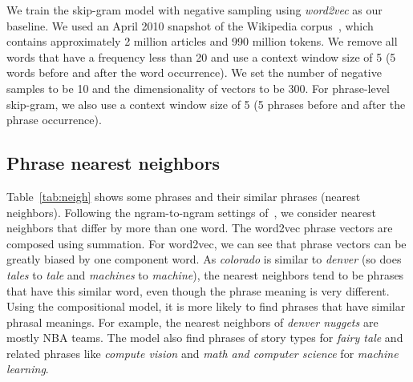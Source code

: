 We train the skip-gram model with negative sampling using \textit{word2vec} as our baseline. We used an April 2010 snapshot of the Wikipedia corpus~\cite{wiki2010}, which contains approximately 2 million articles and 990 million tokens. 
We remove all words that have a frequency less than 20 and use a context window size of 5 (5 words before and after the word occurrence). 
We set the number of negative samples to be 10 and the dimensionality of vectors to be 300. 
For phrase-level skip-gram, we also use a context window size of 5 (5 phrases before and after the phrase occurrence).

\begin{table}
\centering
\begin{center}
\caption{\small{Comparison of word-level tasks, including word similarity, analogy.}}
\label{tab:word-task}
\end{center}
\end{table}
\subsection{Phrase nearest neighbors}
Table~\ref{tab:neigh} shows some phrases and their similar phrases (nearest neighbors). Following the ngram-to-ngram settings of~, 
we consider nearest neighbors that differ by more than one word. The word2vec phrase vectors are composed using summation. For word2vec, we can see that phrase vectors can be
greatly biased by one component word. As \textit{colorado} is similar to \textit{denver} (so does \textit{tales} to \textit{tale} and \textit{machines} to \textit{machine}), 
the nearest neighbors tend to be phrases that have this similar word, even though the phrase meaning is very different.
Using the compositional model, it is more likely to find phrases that have similar phrasal meanings. For example, the nearest neighbors of
\textit{denver nuggets} are mostly NBA teams. The model also find phrases of story types for \textit{fairy tale}
and related phrases like \textit{compute vision} and \textit{math and computer science} for \textit{machine learning}.


